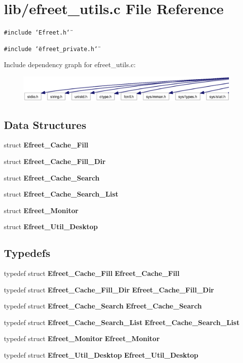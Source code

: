 \section{lib/efreet\_\-utils.c File Reference}
\label{efreet__utils_8c}


{\tt \#include \char`\"{}Efreet.h\char`\"{}}\par
{\tt \#include \char`\"{}efreet\_\-private.h\char`\"{}}\par


Include dependency graph for efreet\_\-utils.c:\nopagebreak
\begin{figure}[H]
\begin{center}
\leavevmode
\includegraphics[width=420pt]{efreet__utils_8c__incl}
\end{center}
\end{figure}
\subsection*{Data Structures}
\begin{CompactItemize}
\item 
struct {\bf Efreet\_\-Cache\_\-Fill}
\item 
struct {\bf Efreet\_\-Cache\_\-Fill\_\-Dir}
\item 
struct {\bf Efreet\_\-Cache\_\-Search}
\item 
struct {\bf Efreet\_\-Cache\_\-Search\_\-List}
\item 
struct {\bf Efreet\_\-Monitor}
\item 
struct {\bf Efreet\_\-Util\_\-Desktop}
\end{CompactItemize}
\subsection*{Typedefs}
\begin{CompactItemize}
\item 
typedef struct {\bf Efreet\_\-Cache\_\-Fill} {\bf Efreet\_\-Cache\_\-Fill}
\item 
typedef struct {\bf Efreet\_\-Cache\_\-Fill\_\-Dir} {\bf Efreet\_\-Cache\_\-Fill\_\-Dir}
\item 
typedef struct {\bf Efreet\_\-Cache\_\-Search} {\bf Efreet\_\-Cache\_\-Search}
\item 
typedef struct {\bf Efreet\_\-Cache\_\-Search\_\-List} {\bf Efreet\_\-Cache\_\-Search\_\-List}
\item 
typedef struct {\bf Efreet\_\-Monitor} {\bf Efreet\_\-Monitor}
\item 
typedef struct {\bf Efreet\_\-Util\_\-Desktop} {\bf Efreet\_\-Util\_\-Desktop}
\end{CompactItemize}
